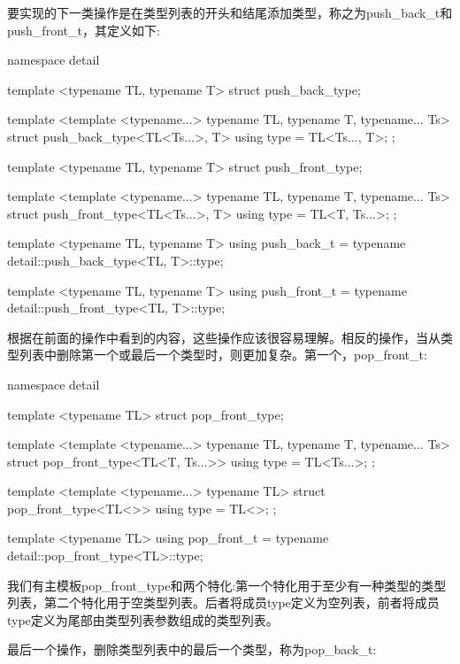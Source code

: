 要实现的下一类操作是在类型列表的开头和结尾添加类型，称之为push\_back\_t和push\_front\_t，其定义如下:

\begin{cpp}
namespace detail
{
	template <typename TL, typename T>
	struct push_back_type;
	
	template <template <typename...> typename TL,
			  typename T, typename... Ts>
	struct push_back_type<TL<Ts...>, T>
	{
		using type = TL<Ts..., T>;
	};

	template <typename TL, typename T>
	struct push_front_type;
	
	template <template <typename...> typename TL,
			  typename T, typename... Ts>
	struct push_front_type<TL<Ts...>, T>
	{
		using type = TL<T, Ts...>;
	};
}

template <typename TL, typename T>
using push_back_t =
	typename detail::push_back_type<TL, T>::type;
	
template <typename TL, typename T>
using push_front_t =
	typename detail::push_front_type<TL, T>::type;
\end{cpp}

根据在前面的操作中看到的内容，这些操作应该很容易理解。相反的操作，当从类型列表中删除第一个或最后一个类型时，则更加复杂。第一个，pop\_front\_t:

\begin{cpp}
namespace detail
{
	template <typename TL>
	struct pop_front_type;
	
	template <template <typename...> typename TL,
	          typename T, typename... Ts>
	struct pop_front_type<TL<T, Ts...>>
	{
		using type = TL<Ts...>;
	};

	template <template <typename...> typename TL>
	struct pop_front_type<TL<>>
	{
		using type = TL<>;
	};
}

template <typename TL>
using pop_front_t =
	typename detail::pop_front_type<TL>::type;
\end{cpp}

我们有主模板pop\_front\_type和两个特化:第一个特化用于至少有一种类型的类型列表，第二个特化用于空类型列表。后者将成员type定义为空列表，前者将成员type定义为尾部由类型列表参数组成的类型列表。

最后一个操作，删除类型列表中的最后一个类型，称为pop\_back\_t:

